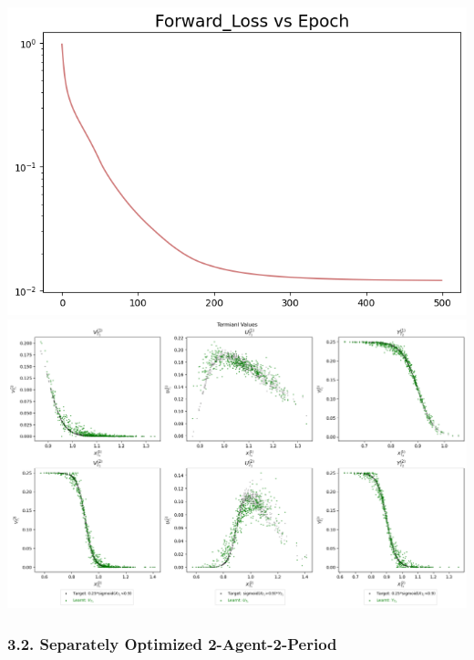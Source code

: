 \documentclass[
]{article}
\begin{document}
\includegraphics{Illustration_Diagrams/joint-2A2P-Sigmoid-ResExamples/Loss.png}
\includegraphics{Illustration_Diagrams/joint-2A2P-Sigmoid-ResExamples/sigmoid_target.png}

\hypertarget{separately-optimized-2-agent-2-period}{%
\subsubsection{3.2. Separately Optimized
2-Agent-2-Period}\label{separately-optimized-2-agent-2-period}}
\end{document}
